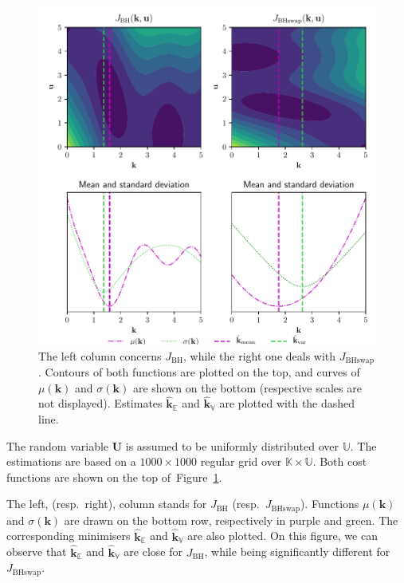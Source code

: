 \documentclass[preprint, review, 1p]{elsarticle}
\newcommand{\Ex}{\mathbb{E}}
\newcommand{\kmean}{{\mathbf{k}}_{\Ex}}
\newcommand{\hatkmean}{\hat{\mathbf{k}}_{\Ex}}
\newcommand{\kvar}{{\mathbf{k}}_{\mathbb{V}}}
\newcommand{\hatkvar}{\hat{\mathbf{k}}_{\mathbb{V}}}
\newcommand{\Kspace}{\mathbb{K}}
\newcommand{\Uspace}{\mathbb{U}}
\newcommand{\JBH}{J_{\mathrm{BH}}}
\newcommand{\JBHS}{J_{\mathrm{BHswap}}}
\newlength{\singlecolumnsize}
\begin{document}
\begin{figure}[!ht]
  \centering
  \includegraphics[width=\singlecolumnsize]{Figures/FIG01.pdf}
  \caption{The left column concerns $\JBH$, while the right one deals with $\JBHS$. Contours of both functions are plotted on the top, and curves of  $\mu(\mathbf{k})$ and $\sigma(\mathbf{k})$ are shown on the bottom (respective scales are not displayed). Estimates $\hatkmean$ and $\hatkvar$ are plotted with the dashed line.}
\label{fig:branin_moments}
\end{figure}


The random variable $\mathbf{U}$ is assumed to be uniformly distributed over $\Uspace$.
The estimations are %
based on a $1000 \times 1000$ regular grid over $\Kspace\times\Uspace$. Both cost functions are shown on the top of~Figure~\ref{fig:branin_moments}.


The left, (resp.\ right), column stands for $\JBH$ (resp.\ $\JBHS$).
Functions $\mu(\mathbf{k})$ and $\sigma(\mathbf{k})$ are drawn on the bottom row, respectively in purple and green. The corresponding minimisers $\hatkmean$ and $\hatkvar$ are also plotted.
On this figure, we can observe that $\hatkmean$ and $\hatkvar$ are close for $\JBH$, while being significantly different for $\JBHS$.
\end{document}
